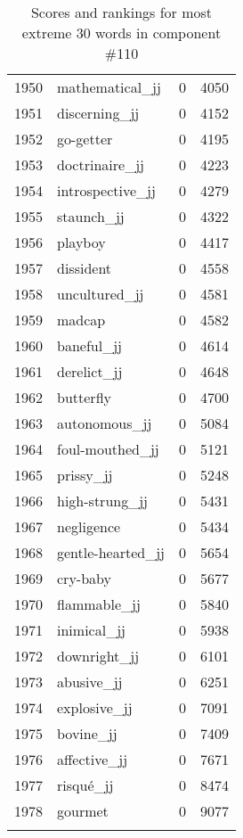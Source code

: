 \begin{longtable}[!htbp]{| rlr@{.}l |}
    1950 & mathematical\_jj & 0 & 4050 \\
    1951 & discerning\_jj & 0 & 4152 \\
    1952 & go-getter & 0 & 4195 \\
    1953 & doctrinaire\_jj & 0 & 4223 \\
    1954 & introspective\_jj & 0 & 4279 \\
    1955 & staunch\_jj & 0 & 4322 \\
    1956 & playboy & 0 & 4417 \\
    1957 & dissident & 0 & 4558 \\
    1958 & uncultured\_jj & 0 & 4581 \\
    1959 & madcap & 0 & 4582 \\
    1960 & baneful\_jj & 0 & 4614 \\
    1961 & derelict\_jj & 0 & 4648 \\
    1962 & butterfly & 0 & 4700 \\
    1963 & autonomous\_jj & 0 & 5084 \\
    1964 & foul-mouthed\_jj & 0 & 5121 \\
    1965 & prissy\_jj & 0 & 5248 \\
    1966 & high-strung\_jj & 0 & 5431 \\
    1967 & negligence & 0 & 5434 \\
    1968 & gentle-hearted\_jj & 0 & 5654 \\
    1969 & cry-baby & 0 & 5677 \\
    1970 & flammable\_jj & 0 & 5840 \\
    1971 & inimical\_jj & 0 & 5938 \\
    1972 & downright\_jj & 0 & 6101 \\
    1973 & abusive\_jj & 0 & 6251 \\
    1974 & explosive\_jj & 0 & 7091 \\
    1975 & bovine\_jj & 0 & 7409 \\
    1976 & affective\_jj & 0 & 7671 \\
    1977 & risqué\_jj & 0 & 8474 \\
    1978 & gourmet & 0 & 9077 \\
    \hline
    \caption{Scores and rankings for most extreme 30 words in component \#110} \\
\end{longtable}
